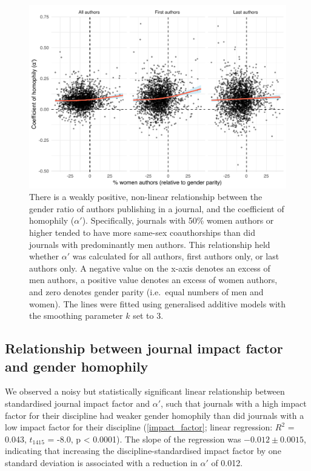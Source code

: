 \documentclass[12pt,]{article}
\begin{document}
\begin{figure}
\centering
\includegraphics{../figures/Fig4.pdf}
\caption{There is a weakly positive, non-linear relationship between the
gender ratio of authors publishing in a journal, and the coefficient of
homophily (\(\alpha'\)). Specifically, journals with 50\% women authors
or higher tended to have more same-sex coauthorships than did journals
with predominantly men authors. This relationship held whether
\(\alpha'\) was calculated for all authors, first authors only, or last
authors only. A negative value on the x-axis denotes an excess of men
authors, a positive value denotes an excess of women authors, and zero
denotes gender parity (i.e.~equal numbers of men and women). The lines
were fitted using generalised additive models with the smoothing
parameter \(k\) set to 3. \label{alpha_gender_ratio}}
\end{figure}

\subsection{Relationship between journal impact factor and gender
homophily}\label{relationship-between-journal-impact-factor-and-gender-homophily}

We observed a noisy but statistically significant linear relationship
between standardised journal impact factor and \(\alpha'\), such that
journals with a high impact factor for their discipline had weaker
gender homophily than did journals with a low impact factor for their
discipline (\autoref{impact_factor}; linear regression: \(R^2\) = 0.043,
\(t_{1415}\) = -8.0, p \textless{} 0.0001). The slope of the regression
was \(-0.012{\pm}0.0015\), indicating that increasing the
discipline-standardised impact factor by one standard deviation is
associated with a reduction in \(\alpha'\) of 0.012.
\end{document}
